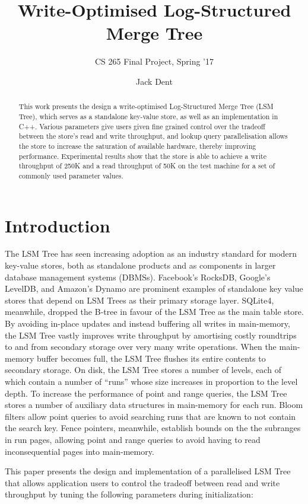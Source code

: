 \documentclass{acm}
\title{Write-Optimised Log-Structured Merge Tree}
\subtitle{CS 265 Final Project, Spring '17}
\author{Jack Dent\\\email{jdent@college.harvard.edu}}
\begin{document}
\maketitle

\begin{abstract}
This work presents the design a write-optimised Log-Structured Merge Tree (LSM Tree), which serves as a standalone key-value store, as well as an implementation in C++. Various parameters give users given fine grained control over the tradeoff between the store's read and write throughput, and lookup query parallelisation allows the store to increase the saturation of available hardware, thereby improving performance. Experimental results show that the store is able to achieve a write throughput of 250K and a read throughput of 50K on the test machine for a set of commonly used parameter values.
\end{abstract}

\section{Introduction}

The LSM Tree has seen increasing adoption as an industry standard for modern key-value stores, both as standalone products and as components in larger database management systems (DBMSs). Facebook's RocksDB, Google's LevelDB, and Amazon's Dynamo are prominent examples of standalone key value stores that depend on LSM Trees as their primary storage layer. SQLite4, meanwhile, dropped the B-tree in favour of the LSM Tree as the main table store. By avoiding in-place updates and instead buffering all writes in main-memory, the LSM Tree vastly improves write throughput by amortising costly roundtrips to and from secondary storage over very many write operations. When the main-memory buffer becomes full, the LSM Tree flushes its entire contents to secondary storage. On disk, the LSM Tree stores a number of levels, each of which contain a number of ``runs'' whose size increases in proportion to the level depth. To increase the performance of point and range queries, the LSM Tree stores a number of auxiliary data structures in main-memory for each run. Bloom filters allow point queries to avoid searching runs that are known to not contain the search key. Fence pointers, meanwhile, establish bounds on the the subranges in run pages, allowing point and range queries to avoid having to read inconsequential pages into main-memory.

This paper presents the design and implementation of a parallelised LSM Tree that allows application users to control the tradeoff between read and write throughput by tuning the following parameters during initialization:
\end{document}
